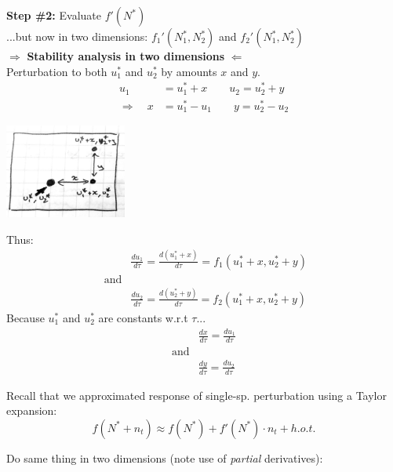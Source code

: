 \documentclass{article}
\newcommand{\ind}{\-\hspace{1cm}}
\begin{document}
\textbf{Step \#2:} Evaluate $f'(N^*)$ \\
\ind \ind \ind \ind ...but now in two dimensions:  $f_1'(N_1^*,N_2^*)$ and $f_2'(N_1^*,N_2^*)$\\

$\Rightarrow$ \textbf{Stability analysis in two dimensions} $\Leftarrow$\\
Perturbation to both $u_1^*$ and $u_2^*$ by amounts $x$ and $y$.
\begin{align*}
	u_1 & = u_1^* + x \quad \quad u_2  = u_2^* + y\\
	\Rightarrow \quad x & =u_1^* - u_1 \quad \quad y  = u_2^* - u_2
\end{align*}

\begin{center}
	\includegraphics[width=4cm]{figs/2Dperturb.pdf}
\end{center}

Thus:
\begin{align*}
	&\frac{du_1}{d\tau}=\frac{d (u_1^* + x)}{d\tau}=f_1(u_1^*+x,u_2^*+y)\\
	\text{ and} &\\
	&\frac{du_2}{d\tau}=\frac{d (u_2^* + y)}{d\tau}=f_2(u_1^*+x,u_2^*+y)	
\end{align*}
Because $u_1^*$ and $u_2^*$ are constants w.r.t $\tau$...
\begin{align*}
	&\frac{dx}{d\tau} = \frac{du_1}{d\tau}\\
	\text{and}&\\
	&\frac{dy}{d\tau}= \frac{du_2}{d\tau}
\end{align*}

Recall that we approximated response of single-sp. perturbation using a Taylor expansion:\\
\begin{equation*}
	f(N^*+n_t)\approx f(N^*)+f'(N^*) \cdot n_t + h.o.t.
\end{equation*}

Do same thing in two dimensions (note use of \emph{partial} derivatives):\\
\end{document}
